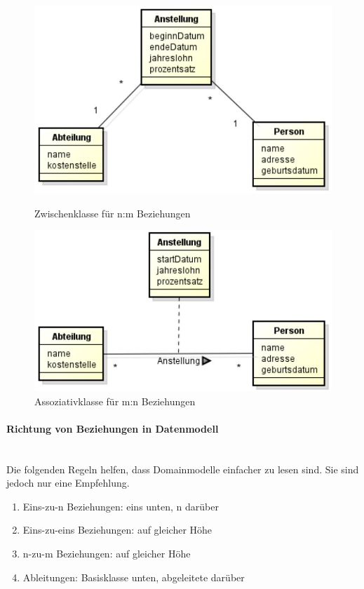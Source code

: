 \begin{figure}[ht!]
	\begin{minipage}[t]{0.4\textwidth}
		\centering
		\includegraphics[width=0.7\linewidth]{images/n_m_relation_default}
		\caption{Zwischenklasse für n:m Beziehungen}
		\label{fig:nmrelationdefault}
	\end{minipage}
	\begin{minipage}[t]{0.4\textwidth}
		\centering
		\includegraphics[width=0.7\linewidth]{images/n_m_relation_assoziative}
		\caption{Assoziativklasse für m:n Beziehungen}
		\label{fig:nmrelationassoziative}
	\end{minipage}
\end{figure}


\paragraph{Richtung von Beziehungen in Datenmodell} \hfill \\
Die folgenden Regeln helfen, dass Domainmodelle einfacher zu lesen sind. Sie sind jedoch nur eine Empfehlung.
\begin{enumerate}
	\item Eins-zu-n Beziehungen: eins unten, n darüber
	\item Eins-zu-eins Beziehungen: auf gleicher Höhe
	\item n-zu-m Beziehungen: auf gleicher Höhe
	\item Ableitungen: Basisklasse unten, abgeleitete darüber
\end{enumerate}

